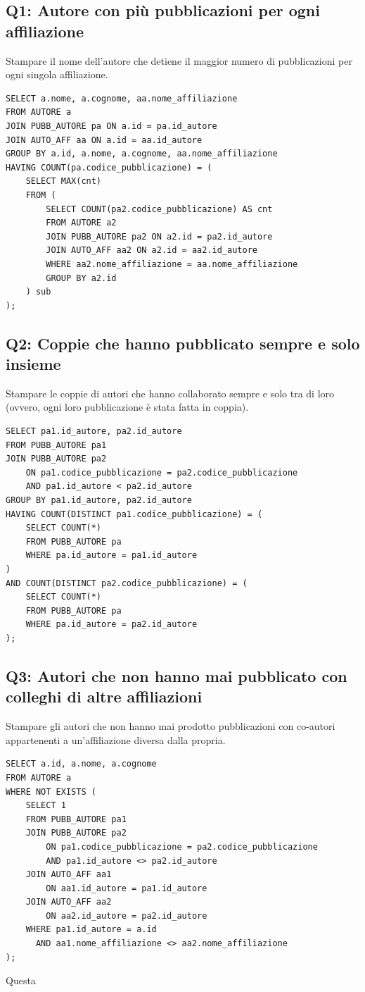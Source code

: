 \documentclass[a4paper,12pt]{article}
\begin{document}
\subsection*{Q1: Autore con più pubblicazioni per ogni affiliazione}
 Stampare il nome dell'autore che detiene il maggior numero di pubblicazioni per ogni singola affiliazione.
\begin{lstlisting}
SELECT a.nome, a.cognome, aa.nome_affiliazione
FROM AUTORE a
JOIN PUBB_AUTORE pa ON a.id = pa.id_autore
JOIN AUTO_AFF aa ON a.id = aa.id_autore
GROUP BY a.id, a.nome, a.cognome, aa.nome_affiliazione
HAVING COUNT(pa.codice_pubblicazione) = (
    SELECT MAX(cnt)
    FROM (
        SELECT COUNT(pa2.codice_pubblicazione) AS cnt
        FROM AUTORE a2
        JOIN PUBB_AUTORE pa2 ON a2.id = pa2.id_autore
        JOIN AUTO_AFF aa2 ON a2.id = aa2.id_autore
        WHERE aa2.nome_affiliazione = aa.nome_affiliazione
        GROUP BY a2.id
    ) sub
);
\end{lstlisting}

\subsection*{Q2: Coppie che hanno pubblicato sempre e solo insieme}
Stampare le coppie di autori che hanno collaborato sempre e solo tra di loro (ovvero, ogni loro pubblicazione è stata fatta in coppia). 
\begin{lstlisting}
SELECT pa1.id_autore, pa2.id_autore
FROM PUBB_AUTORE pa1
JOIN PUBB_AUTORE pa2 
    ON pa1.codice_pubblicazione = pa2.codice_pubblicazione 
    AND pa1.id_autore < pa2.id_autore
GROUP BY pa1.id_autore, pa2.id_autore
HAVING COUNT(DISTINCT pa1.codice_pubblicazione) = (
    SELECT COUNT(*) 
    FROM PUBB_AUTORE pa
    WHERE pa.id_autore = pa1.id_autore
)
AND COUNT(DISTINCT pa2.codice_pubblicazione) = (
    SELECT COUNT(*) 
    FROM PUBB_AUTORE pa
    WHERE pa.id_autore = pa2.id_autore
);
\end{lstlisting}

\newpage

\subsection*{Q3: Autori che non hanno mai pubblicato con colleghi di altre affiliazioni}
Stampare gli autori che non hanno mai prodotto pubblicazioni con co-autori appartenenti a un'affiliazione diversa dalla propria.
\begin{lstlisting}
SELECT a.id, a.nome, a.cognome
FROM AUTORE a
WHERE NOT EXISTS (
    SELECT 1
    FROM PUBB_AUTORE pa1
    JOIN PUBB_AUTORE pa2
        ON pa1.codice_pubblicazione = pa2.codice_pubblicazione
        AND pa1.id_autore <> pa2.id_autore
    JOIN AUTO_AFF aa1
        ON aa1.id_autore = pa1.id_autore
    JOIN AUTO_AFF aa2
        ON aa2.id_autore = pa2.id_autore
    WHERE pa1.id_autore = a.id
      AND aa1.nome_affiliazione <> aa2.nome_affiliazione
);
\end{lstlisting}
Questa 
\end{document}

